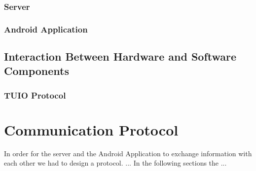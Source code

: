 \documentclass[a4paper,10pt]{report}
\begin{document}
		\subsubsection{Server}

		\subsubsection{Android Application}
		
	\subsection{Interaction Between Hardware and Software Components}
	
		\subsubsection{TUIO Protocol}
		
\section{Communication Protocol}
In order for the server and the Android Application to exchange information with each other we had to design a protocol.
...
In the following sections the ...
\end{document}
